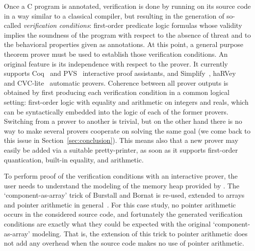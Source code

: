 Once a C program is annotated, verification is done by running
\caduceus{} on its source code in a way similar to a classical
compiler, but resulting in the generation of so-called
\emph{verification conditions}: first-order predicate logic formulas
whose validity implies the soundness of the program with respect to
the absence of threat and to the behavioral properties given as
annotations. At this point, a general purpose theorem prover must be
used to establish those verification conditions.  An original
\caduceus{} feature is its independence with respect to the prover. It
currently supports Coq~\cite{CoqProofAssistant} and PVS~\cite{PVS}
interactive proof assistants, and Simplify~\cite{simplify},
haRVey~\cite{ranise03harvey} and CVC-lite~\cite{barrett04cav}
automatic provers. Coherence between all prover outputs is obtained by
first producing each verification condition in a common logical
setting: first-order logic with equality and arithmetic on integers
and reals, which can be syntactically embedded into the logic of each
of the former provers. Switching from a prover to another is trivial,
but on the other hand there is no way to make several provers
cooperate on solving the same goal (we come back to this issue in
Section~\ref{sec:conclusion}).  This means also that a new prover may
easily be added via a suitable pretty-printer, as soon as it supports
first-order quantication, built-in equality, and arithmetic.

To perform proof of the verification conditions with an
interactive prover, the user needs to understand the
modeling of the memory heap provided by \caduceus{}. The
`component-as-array' trick of Burstall and Bornat is re-used, extended
to arrays and pointer arithmetic in
general~\cite{filliatre04icfem}. For this case study, no pointer
arithmetic occurs in the considered source code, and fortunately the
generated verification conditions are exactly what they could be
expected with the original `component-as-array' modeling. That is, the
extension of this trick to pointer arithmetic does not add any
overhead when the source code makes no use of pointer arithmetic.

